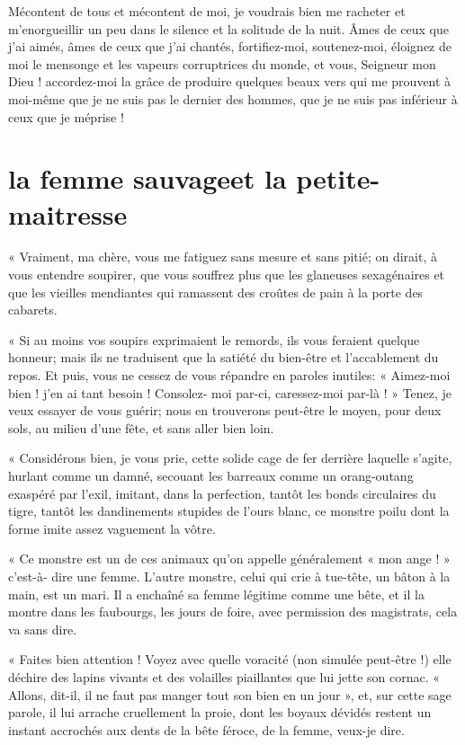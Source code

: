 Mécontent de tous et mécontent de moi, je voudrais bien me racheter et
m’enorgueillir un peu dans le silence et la solitude
de la nuit. Âmes de ceux que j’ai aimés, âmes de ceux
que j’ai chantés, fortifiez{}-moi, soutenez{}-moi,
éloignez de moi le mensonge et les vapeurs corruptrices du monde, et
vous, Seigneur mon Dieu ! accordez{}-moi la grâce de produire quelques
beaux vers qui me prouvent à moi{}-même que je ne suis pas le dernier
des hommes, que je ne suis pas inférieur à ceux que je méprise !

\quebra\section[La femme sauvage et la petite{}-maitresse]{la femme sauvage\break et la petite{}-maitresse}

« Vraiment, ma chère, vous me fatiguez sans mesure et sans pitié; on
dirait, à vous entendre soupirer, que vous souffrez plus que les
glaneuses sexagénaires et que les vieilles mendiantes qui ramassent des
croûtes de pain à la porte des cabarets.

« Si au moins vos soupirs exprimaient le remords, ils vous feraient
quelque honneur; mais ils ne traduisent que la satiété du bien{}-être
et l’accablement du repos. Et puis, vous ne cessez de
vous répandre en paroles inutiles: « Aimez{}-moi bien !
j’en ai tant besoin ! Consolez{}- moi par{}-ci,
caressez{}-moi par{}-là ! » Tenez, je veux essayer de vous guérir; nous
en trouverons peut{}-être le moyen, pour deux sols, au milieu
d’une fête, et sans aller bien loin.

« Considérons bien, je vous prie, cette solide cage de fer derrière
laquelle s’agite, hurlant comme un damné, secouant les
barreaux comme un orang{}-outang exaspéré par l’exil,
imitant, dans la perfection, tantôt les bonds circulaires du tigre,
tantôt les dandinements stupides de l’ours blanc, ce
monstre poilu dont la forme imite assez vaguement la vôtre.

« Ce monstre est un de ces animaux qu’on appelle
généralement « mon ange ! » c’est{}-à{}- dire une
femme. L’autre monstre, celui qui crie à tue{}-tête,
un bâton à la main, est un mari. Il a enchaîné sa femme légitime comme
une bête, et il la montre dans les faubourgs, les jours de foire, avec
permission des magistrats, cela va sans dire.

« Faites bien attention ! Voyez avec quelle voracité (non simulée
peut{}-être !) elle déchire des lapins vivants et des volailles
piaillantes que lui jette son cornac. « Allons, dit{}-il, il ne faut
pas manger tout son bien en un jour », et, sur cette sage parole, il
lui arrache cruellement la proie, dont les boyaux dévidés restent un
instant accrochés aux dents de la bête féroce, de la femme, veux{}-je
dire.

